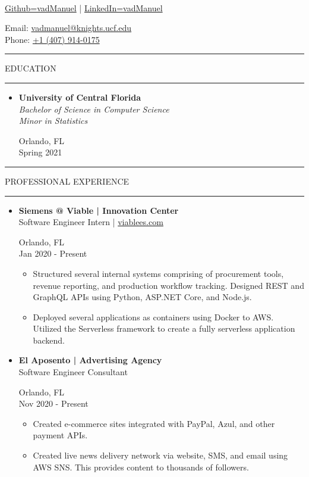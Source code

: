 \documentclass{article}
\makeatletter
\newcommand{\name}{Manuel Vasquez}
\newcommand{\website}{\href{https://www.github.com/vadmanuel}{Github=vadManuel} | \href{https://www.linkedin.com/in/vadmanuel}{LinkedIn=vadManuel}}
\newcommand{\email}{\href{mailto:vadmanuel@knights.ucf.edu}{vadmanuel@knights.ucf.edu}}
\newcommand{\phone}{\href{tel:+14079140175}{+1 (407) 914-0175}}
\newcommand{\makeminipage}[4]{
    \begin{minipage}[c]{.7\linewidth} 
        \flushleft #1 \\ #2
    \end{minipage} \hfill
    \begin{minipage}[c]{.29\linewidth}
        \flushright #3 \\ #4
    \end{minipage}
}
\newcommand{\makesection}[1]{\hrule\vskip1mm\uppercase{#1}\vskip1mm\hrule}
\makeatother
\begin{document}
\setlength{\parindent}{0cm}

\makeminipage
    {{\large\textbf{\name}}}
    {\website}
    {Email: \email}
    {Phone: \phone}
\bigbreak

\makesection{Education}
\begin{itemize}[leftmargin=.35cm]
    \item {
    \makeminipage
        {\textbf{University of Central Florida}}
        {\textit{Bachelor of Science in Computer Science} \\
        \textit{Minor in Statistics}}
        {Orlando, FL}
        {Spring 2021}
    }
\end{itemize}

\begin{minipage}[t]{.68\linewidth}
    \makesection{Professional Experience}
    \begin{itemize}[leftmargin=.35cm]

        \item \makeminipage
            {\textbf{Siemens @ Viable | Innovation Center}}
            {Software Engineer Intern | \href{https://wwww.viablees.com}{viablees.com}}
            {Orlando, FL}
            {Jan 2020 - Present}
            \vspace*{-1.5mm}
            \raggedright
            \begin{itemize}[leftmargin=.35cm]
                \item Structured several internal systems comprising of procurement tools, revenue reporting, and production workflow tracking. Designed REST and GraphQL APIs using Python, ASP.NET Core, and Node.js.
                \item Deployed several applications as containers using Docker to AWS. Utilized the Serverless framework to create a fully serverless application backend.
            \end{itemize}

        \item \makeminipage
            {\textbf{El Aposento | Advertising Agency}}
            {Software Engineer Consultant}
            {Orlando, FL}
            {Nov 2020 - Present}
            \vspace*{-1.5mm}
            \raggedright
            \begin{itemize}[leftmargin=.35cm]
                \item Created e-commerce sites integrated with PayPal, Azul, and other payment APIs.
                \item Created live news delivery network via website, SMS, and email using AWS SNS. This provides content to thousands of followers.
            \end{itemize}


\end{itemize}
\end{minipage}
\end{document}
